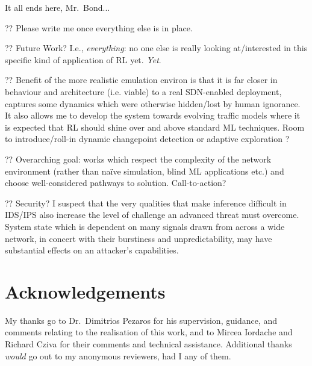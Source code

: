 \documentclass[conference, letterpaper, 10pt, times]{IEEEtran}
\begin{document}
It all ends here, Mr.\ Bond...

?? Please write me once everything else is in place.

?? Future Work? I.e., \emph{everything}: no one else is really looking at/interested in this specific kind of application of RL yet. \emph{Yet}.

?? Benefit of the more realistic emulation environ is that it is far closer in behaviour and architecture (i.e. viable) to a real SDN-enabled deployment, captures some dynamics which were otherwise hidden/lost by human ignorance. It also allows me to develop the system towards evolving traffic models where it is expected that RL should shine over and above standard ML techniques. Room to introduce/roll-in dynamic changepoint detection or adaptive exploration \cite{DBLP:conf/ki/Tokic10, DBLP:conf/ki/TokicP11, DBLP:conf/annpr/TokicP12}?

?? Overarching goal: works which respect the complexity of the network environment (rather than na\"{i}ve simulation, blind ML applications etc.) and choose well-considered pathways to solution. Call-to-action?

?? Security? I suspect that the very qualities that make inference difficult in IDS/IPS also increase the level of challenge an advanced threat must overcome.
System state which is dependent on many signals drawn from across a wide network, in concert with their burstiness and unpredictability, may have substantial effects on an attacker's capabilities.

\section*{Acknowledgements}
My thanks go to Dr.\ Dimitrios Pezaros for his supervision, guidance, and comments relating to the realisation of this work, and to Mircea Iordache and Richard Cziva for their comments and technical assistance.
Additional thanks \emph{would} go out to my anonymous reviewers, had I any of them.

\printbibliography
\end{document}
